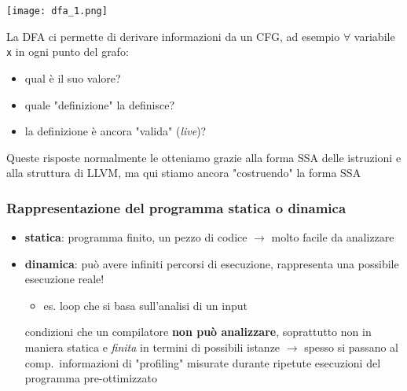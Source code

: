 \begin{example}
  \noindent\begin{minipage}[c]{.3\textwidth}
    \texttt{[image: dfa\_1.png]}
  \end{minipage}\hfill
  \begin{minipage}[c]{.65\textwidth}
    La DFA ci permette di derivare informazioni da un CFG, ad esempio $\forall$ variabile \lstinline|x| in ogni punto del grafo:
    \begin{itemize}
      \item qual \`e il suo valore?
      \item quale "definizione" la definisce?
      \item la definizione \`e ancora "valida" (\textit{live})?
    \end{itemize}
  \end{minipage}

  \begin{emphasize}
    Queste risposte normalmente le otteniamo grazie alla forma SSA delle istruzioni e alla struttura di LLVM, ma qui stiamo ancora "costruendo" la forma SSA
  \end{emphasize}
\end{example}

\subsubsection{Rappresentazione del programma statica o dinamica}

\begin{itemize}
  \item \textbf{statica}: programma finito, un pezzo di codice $\rightarrow$ molto facile da analizzare
  \item \textbf{dinamica}: pu\`o avere infiniti percorsi di esecuzione, rappresenta una possibile esecuzione reale!
    \begin{itemize}
      \item es. loop che si basa sull'analisi di un input
    \end{itemize}
    \begin{emphasize}
      condizioni che un compilatore \textbf{non pu\`o analizzare}, soprattutto non in maniera statica e \textit{finita} in termini di possibili istanze $\rightarrow$ spesso si passano al comp.~informazioni di "profiling" misurate durante ripetute esecuzioni del programma pre-ottimizzato
    \end{emphasize}
\end{itemize}


